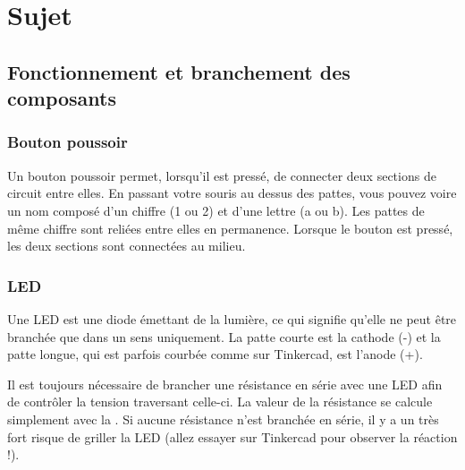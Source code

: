\section{Sujet}

\subsection{Fonctionnement et branchement des composants}

\subsubsection{Bouton poussoir}

Un bouton poussoir permet, lorsqu'il est pressé, de connecter deux sections de circuit entre elles.
En passant votre souris au dessus des pattes, vous pouvez voire un nom composé d'un chiffre (1 ou 2) et d'une lettre (a ou b).
Les pattes de même chiffre sont reliées entre elles en permanence.
Lorsque le bouton est pressé, les deux sections sont connectées au milieu.

\subsubsection{LED}

Une LED est une diode émettant de la lumière, ce qui signifie qu'elle ne peut être branchée que dans un sens uniquement.
La patte courte est la cathode (-) et la patte longue, qui est parfois courbée comme sur Tinkercad, est l'anode (+).

Il est toujours nécessaire de brancher une résistance en série avec une LED afin de contrôler la tension traversant celle-ci.
La valeur de la résistance se calcule simplement avec la .
Si aucune résistance n'est branchée en série, il y a un très fort risque de griller la LED (allez essayer sur Tinkercad pour observer la réaction !).

